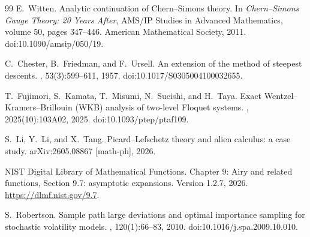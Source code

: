 \documentclass[11pt]{article}
\begin{document}
\begin{thebibliography}{99}
E.~Witten.
\newblock Analytic continuation of Chern--Simons theory.
\newblock In {\em Chern--Simons Gauge Theory: 20 Years After}, AMS/IP Studies in Advanced Mathematics, volume 50, pages 347--446. American Mathematical Society, 2011.
\newblock doi:10.1090/amsip/050/19.

C.~Chester, B.~Friedman, and F.~Ursell.
\newblock An extension of the method of steepest descents.
, 53(3):599--611, 1957.
\newblock doi:10.1017/S0305004100032655.

T.~Fujimori, S.~Kamata, T.~Misumi, N.~Sueishi, and H.~Taya.
\newblock Exact Wentzel--Kramers--Brillouin (WKB) analysis of two-level Floquet systems.
, 2025(10):103A02, 2025.
\newblock doi:10.1093/ptep/ptaf109.

S.~Li, Y.~Li, and X.~Tang.
\newblock Picard--Lefschetz theory and alien calculus: a case study.
\newblock arXiv:2605.08867 [math-ph], 2026.

NIST Digital Library of Mathematical Functions.
\newblock Chapter 9: Airy and related functions, Section 9.7: asymptotic expansions.
\newblock Version 1.2.7, 2026. \url{https://dlmf.nist.gov/9.7}.

S.~Robertson.
\newblock Sample path large deviations and optimal importance sampling for stochastic volatility models.
, 120(1):66--83, 2010.
\newblock doi:10.1016/j.spa.2009.10.010.

\end{thebibliography}
\end{document}
